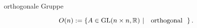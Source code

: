 \documentclass[class=article, crop=false]{standalone}
\begin{document}
\begin{zettel}{orthogonale Gruppe}
\begin{flashcard}
\begin{definition}
\[
O (n):= \set{A \in  \GL(n \times n,\R )}{\tx{ orthogonal }}
.\]
\end{definition}

\end{flashcard}
\end{zettel}
\end{document}
